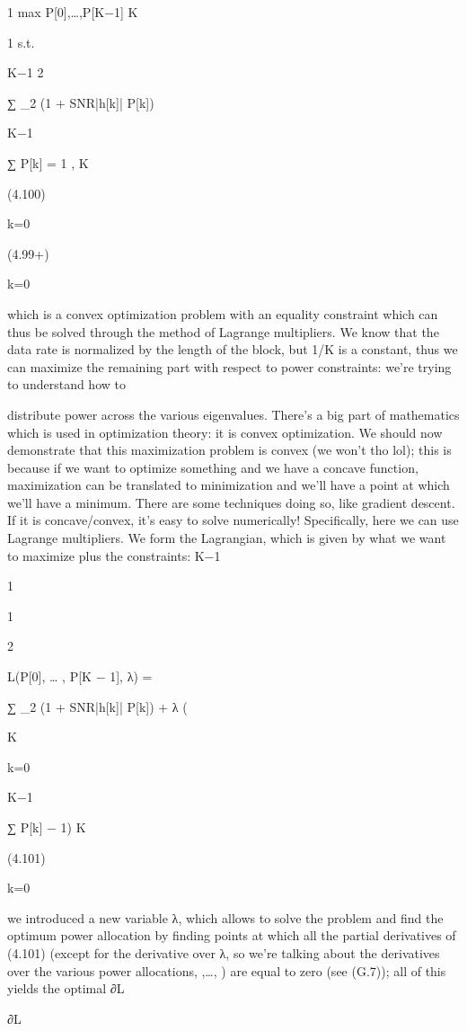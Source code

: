 {{{{{1 max P[0],…,P[K−1] K

1 s.t.

K−1 2

∑ \log_2 (1 + SNR|h[k]| P[k])

K−1

∑ P[k] = 1 ,
K

(4.100)

k=0

(4.99+)

k=0

which is a convex optimization problem with an equality constraint which can thus be solved through the method of Lagrange multipliers. We know that the data rate is normalized by the length of the block, but 1/K is a constant, thus we can maximize the remaining part with respect to power constraints: we're trying to understand how to

distribute power across the various eigenvalues. There's a big part of mathematics which is used in optimization theory: it is convex optimization.
We should now demonstrate that this maximization problem is convex (we won't tho lol); this is because if we want to optimize something and we have a concave function,
maximization can be translated to minimization and we'll have a point at which we'll have a minimum. There are some techniques doing so, like gradient descent. If it is concave/convex, it's easy to solve numerically! Specifically, here we can use Lagrange multipliers. We form the Lagrangian, which is given by what we want to maximize plus the constraints:
K−1

1

1

2

L(P[0], … , P[K − 1], λ) =

∑ \log_2 (1 + SNR|h[k]| P[k]) + λ (

K

k=0

K−1

∑ P[k] − 1)
K

(4.101)

k=0

we introduced a new variable λ, which allows to solve the problem and find the optimum power allocation by finding points at which all the partial derivatives of (4.101) (except for the derivative over λ, so we're talking about the derivatives over the various power allocations,
,…,
) are equal to zero (see (G.7)); all of this yields the optimal
∂L

∂L

}}}}}
